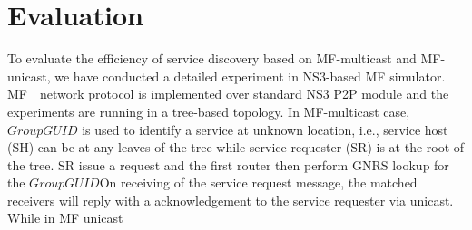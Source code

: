 \section{Evaluation}
To evaluate the efficiency of service discovery based on MF-multicast and MF-unicast, we have conducted a detailed experiment in NS3-based MF simulator.  MF　network protocol is implemented over standard NS3 P2P module and the experiments are running in a tree-based topology. In MF-multicast case, $Group GUID$ is used to identify a service at unknown location, i.e., service host (SH) can be at any  leaves of the tree while service requester (SR) is at the root of the tree. SR issue a request and the first router then perform  GNRS lookup for the $Group GUID$On receiving of the service request message, the matched receivers will reply with a acknowledgement to the service requester via unicast. While in MF unicast 

